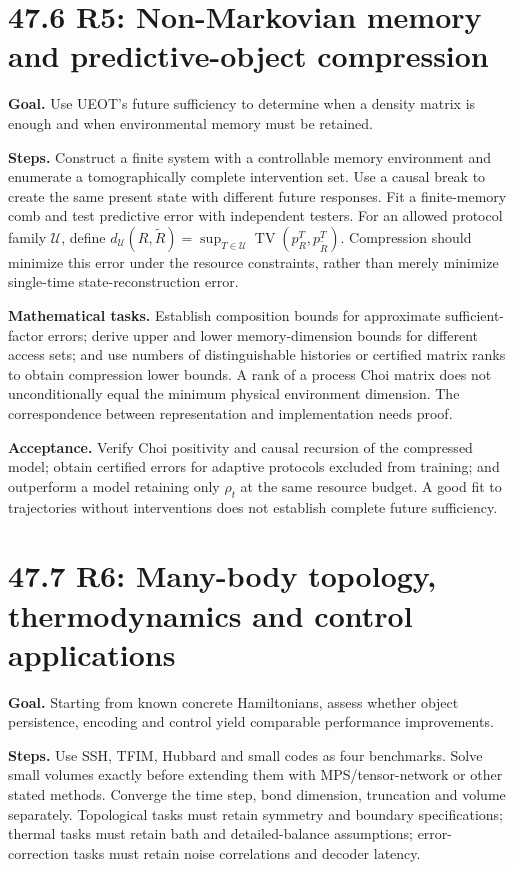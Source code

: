 \documentclass[
  11pt,
  oneside]{book}
\begin{document}
\section{47.6 R5: Non-Markovian memory and predictive-object
compression}

\textbf{Goal.} Use UEOT's future sufficiency to determine when a density
matrix is enough and when environmental memory must be retained.

\textbf{Steps.} Construct a finite system with a controllable memory
environment and enumerate a tomographically complete intervention set.
Use a causal break to create the same present state with different
future responses. Fit a finite-memory comb and test predictive error
with independent testers. For an allowed protocol family \(\mathcal U\),
define
\(d_{\mathcal U}(R,\widetilde R)=\sup_{T\in\mathcal U}\operatorname{TV}(p_R^T,p_{\widetilde R}^T)\).
Compression should minimize this error under the resource constraints,
rather than merely minimize single-time state-reconstruction error.

\textbf{Mathematical tasks.} Establish composition bounds for
approximate sufficient-factor errors; derive upper and lower
memory-dimension bounds for different access sets; and use numbers of
distinguishable histories or certified matrix ranks to obtain
compression lower bounds. A rank of a process Choi matrix does not
unconditionally equal the minimum physical environment dimension. The
correspondence between representation and implementation needs proof.

\textbf{Acceptance.} Verify Choi positivity and causal recursion of the
compressed model; obtain certified errors for adaptive protocols
excluded from training; and outperform a model retaining only \(\rho_t\)
at the same resource budget. A good fit to trajectories without
interventions does not establish complete future sufficiency.

\section{47.7 R6: Many-body topology, thermodynamics and control
applications}

\textbf{Goal.} Starting from known concrete Hamiltonians, assess whether
object persistence, encoding and control yield comparable performance
improvements.

\textbf{Steps.} Use SSH, TFIM, Hubbard and small codes as four
benchmarks. Solve small volumes exactly before extending them with
MPS/tensor-network or other stated methods. Converge the time step, bond
dimension, truncation and volume separately. Topological tasks must
retain symmetry and boundary specifications; thermal tasks must retain
bath and detailed-balance assumptions; error-correction tasks must
retain noise correlations and decoder latency.
\end{document}
